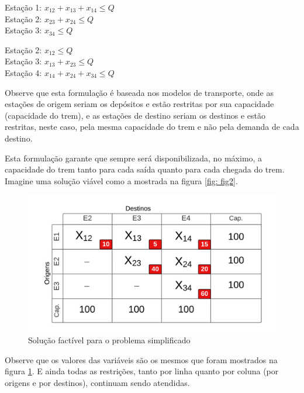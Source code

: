 
Estação 1: $x_{12} + x_{13} + x_{14} \leq Q $ \\
\indent Estação 2: $x_{23} + x_{24}  \leq  Q $ \\
\indent Estação 3: $x_{34} \leq Q $


Estação 2: $x_{12} \leq Q $ \\
\indent Estação 3: $x_{13} + x_{23}  \leq  Q $ \\
\indent Estação 4: $x_{14} + x_{24} + x_{34} \leq Q $

Observe que esta formulação é baseada nos modelos de transporte, onde as estações de origem seriam os depósitos e estão restritas por sua capacidade (capacidade do trem), e as estações de destino seriam os destinos e estão restritas, neste caso, pela mesma capacidade do trem e não pela demanda de cada destino.

Esta formulação garante que sempre será disponibilizada, no máximo, a capacidade do trem tanto para cada saída quanto para cada chegada do trem. Imagine uma solução viável como a mostrada na figura \ref{fig: fig2}.

\begin{figure}[h]
	\begin{center}
		\includegraphics[scale=0.4]{img/fig3.png}
		\caption{Solução factível para o problema simplificado}
		\label{fig: fig3}
	\end{center}
\end{figure}

Observe que os valores das variáveis são os mesmos que foram mostrados na figura \ref{fig: fig3}. E ainda todas as restrições, tanto por linha quanto por coluna (por origens e por destinos), continuam sendo atendidas.

